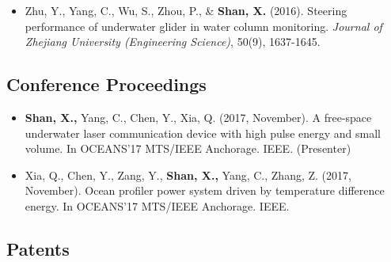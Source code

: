 \documentclass[11pt,a4paper,sans]{moderncv}         %
\begin{document}
    \begin{itemize}

        \item{Zhu, Y., Yang, C., Wu, S., Zhou, P., \& \textbf{Shan, X.} (2016). Steering performance of underwater glider in water column monitoring. \textit{Journal of Zhejiang University (Engineering Science)}, 50(9), 1637-1645.}

        \vspace{3pt}

    \end{itemize}

\subsection{Conference Proceedings}   

    \begin{itemize}

        \item{\textbf{Shan, X.,}  Yang, C., Chen, Y., Xia, Q. (2017, November). A free-space underwater laser communication device with high pulse energy and small volume. In OCEANS'17 MTS/IEEE Anchorage. IEEE. (Presenter)}

        \vspace{3pt}

    \end{itemize}

    \begin{itemize}
        
        \item{Xia, Q., Chen, Y., Zang, Y., \textbf{Shan, X.,}  Yang, C., Zhang, Z. (2017, November). Ocean profiler power system driven by temperature difference energy. In OCEANS'17 MTS/IEEE Anchorage. IEEE.}

        \vspace{3pt}

    \end{itemize}

\subsection{Patents} 
\end{document}
